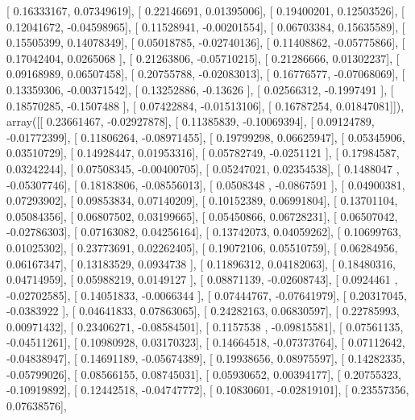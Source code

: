 \documentclass{article}
\begin{document}
       [ 0.16333167,  0.07349619],
       [ 0.22146691,  0.01395006],
       [ 0.19400201,  0.12503526],
       [ 0.12041672, -0.04598965],
       [ 0.11528941, -0.00201554],
       [ 0.06703384,  0.15635589],
       [ 0.15505399,  0.14078349],
       [ 0.05018785, -0.02740136],
       [ 0.11408862, -0.05775866],
       [ 0.17042404,  0.0265068 ],
       [ 0.21263806, -0.05710215],
       [ 0.21286666,  0.01302237],
       [ 0.09168989,  0.06507458],
       [ 0.20755788, -0.02083013],
       [ 0.16776577, -0.07068069],
       [ 0.13359306, -0.00371542],
       [ 0.13252886, -0.13626   ],
       [ 0.02566312, -0.1997491 ],
       [ 0.18570285, -0.1507488 ],
       [ 0.07422884, -0.01513106],
       [ 0.16787254,  0.01847081]]), array([[ 0.23661467, -0.02927878],
       [ 0.11385839, -0.10069394],
       [ 0.09124789, -0.01772399],
       [ 0.11806264, -0.08971455],
       [ 0.19799298,  0.06625947],
       [ 0.05345906,  0.03510729],
       [ 0.14928447,  0.01953316],
       [ 0.05782749, -0.0251121 ],
       [ 0.17984587,  0.03242244],
       [ 0.07508345, -0.00400705],
       [ 0.05247021,  0.02354538],
       [ 0.1488047 , -0.05307746],
       [ 0.18183806, -0.08556013],
       [ 0.0508348 , -0.0867591 ],
       [ 0.04900381,  0.07293902],
       [ 0.09853834,  0.07140209],
       [ 0.10152389,  0.06991804],
       [ 0.13701104,  0.05084356],
       [ 0.06807502,  0.03199665],
       [ 0.05450866,  0.06728231],
       [ 0.06507042, -0.02786303],
       [ 0.07163082,  0.04256164],
       [ 0.13742073,  0.04059262],
       [ 0.10699763,  0.01025302],
       [ 0.23773691,  0.02262405],
       [ 0.19072106,  0.05510759],
       [ 0.06284956,  0.06167347],
       [ 0.13183529,  0.0934738 ],
       [ 0.11896312,  0.04182063],
       [ 0.18480316,  0.04714959],
       [ 0.05988219,  0.0149127 ],
       [ 0.08871139, -0.02608743],
       [ 0.0924461 , -0.02702585],
       [ 0.14051833, -0.0066344 ],
       [ 0.07444767, -0.07641979],
       [ 0.20317045, -0.0383922 ],
       [ 0.04641833,  0.07863065],
       [ 0.24282163,  0.06830597],
       [ 0.22785993,  0.00971432],
       [ 0.23406271, -0.08584501],
       [ 0.1157538 , -0.09815581],
       [ 0.07561135, -0.04511261],
       [ 0.10980928,  0.03170323],
       [ 0.14664518, -0.07373764],
       [ 0.07112642, -0.04838947],
       [ 0.14691189, -0.05674389],
       [ 0.19938656,  0.08975597],
       [ 0.14282335, -0.05799026],
       [ 0.08566155,  0.08745031],
       [ 0.05930652,  0.00394177],
       [ 0.20755323, -0.10919892],
       [ 0.12442518, -0.04747772],
       [ 0.10830601, -0.02819101],
       [ 0.23557356,  0.07638576],
\end{document}
